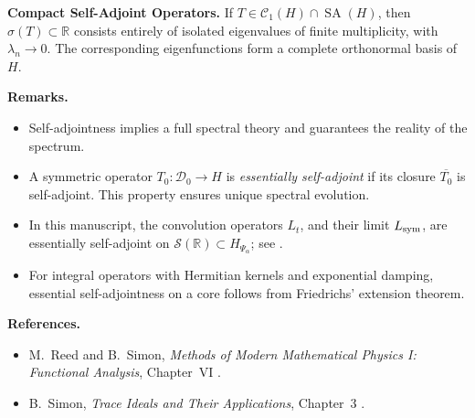 \begin{definition}
\medskip
\noindent\textbf{Compact Self-Adjoint Operators.}
If \( T \in \mathcal{C}_1(H) \cap \operatorname{SA}(H) \), then \( \sigma(T) \subset \mathbb{R} \) consists entirely of isolated eigenvalues of finite multiplicity, with \( \lambda_n \to 0 \). The corresponding eigenfunctions form a complete orthonormal basis of \( H \).

\medskip
\noindent\textbf{Remarks.}
\begin{itemize}
    \item Self-adjointness implies a full spectral theory and guarantees the reality of the spectrum.
    \item A symmetric operator \( T_0 \colon \mathcal{D}_0 \to H \) is \emph{essentially self-adjoint} if its closure \( \overline{T_0} \) is self-adjoint. This property ensures unique spectral evolution.
    \item In this manuscript, the convolution operators \( L_t \), and their limit \( L_{\mathrm{sym}} \), are essentially self-adjoint on \( \mathcal{S}(\mathbb{R}) \subset H_{\Psi_\alpha} \); see .
    \item For integral operators with Hermitian kernels and exponential damping, essential self-adjointness on a core follows from Friedrichs' extension theorem.
\end{itemize}

\medskip
\noindent\textbf{References.}
\begin{itemize}
    \item M.~Reed and B.~Simon, \emph{Methods of Modern Mathematical Physics I: Functional Analysis}, Chapter~VI \cite{ReedSimon1980I}.
    \item B.~Simon, \emph{Trace Ideals and Their Applications}, Chapter~3 \cite{Simon2005TraceIdeals}.
\end{itemize}
\end{definition}
